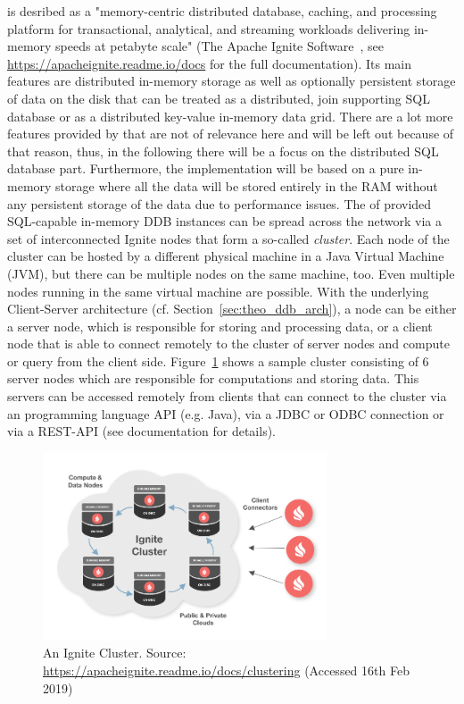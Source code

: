  is desribed as a "memory-centric distributed database, caching, and processing platform for transactional, analytical, and streaming
workloads delivering in-memory speeds at petabyte scale" (The Apache Ignite Software~\citet{Ignite}, see \url{https://apacheignite.readme.io/docs} for the full
documentation).
Its main features are distributed in-memory storage as well as optionally persistent storage of data on the disk that can be treated as a distributed, join
supporting SQL database or as a distributed key-value in-memory data grid. There are a lot more features provided by  that are not of
relevance here and will be left out because of that reason, thus, in the following there will be a focus on the distributed SQL database part.
Furthermore, the implementation will be based on a pure in-memory storage where all the data will be stored entirely in the RAM without any persistent 
storage of the data due to performance issues. The of  provided SQL-capable in-memory DDB instances can be spread across the network 
via a set of interconnected Ignite nodes that form a so-called \emph{cluster}. Each node of the cluster can be hosted by a different physical machine 
in a Java Virtual Machine (JVM), but there can be multiple nodes on the same machine, too. Even multiple nodes running in the same virtual machine are
possible. With the underlying Client-Server architecture (cf. Section~\ref{sec:theo_ddb_arch}), a node can be either a server node, which is responsible for storing and processing data, or a
client node that is able to connect remotely to the cluster of server nodes and compute or query from the client side. Figure~\ref{fig:ign_cluster} shows
a sample cluster consisting of 6 server nodes which are responsible for computations and storing data. This servers can be accessed remotely from clients
that can connect to the cluster via an programming language API (e.g. Java), via a JDBC or ODBC connection or via a REST-API (see documentation for
details). 

\begin{figure}[h]
    \centering
    \includegraphics[width=0.75\textwidth,keepaspectratio=true]{img/9287d3c-ignite-deploy.png}
    \caption{An Ignite Cluster. Source: \protect\url{https://apacheignite.readme.io/docs/clustering} (Accessed 16th Feb 2019)}
    \label{fig:ign_cluster}
\end{figure}


